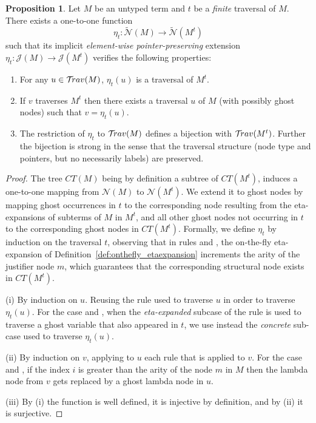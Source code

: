\documentclass{article}
\theoremstyle{definition}
\newtheorem{proposition}{Proposition}[section]
\newcommand\Nodes{\mathcal{N}}%
\newcommand\ExtendedNodes{\tilde{\Nodes}}
\newcommand{\travulc}{\travset}
\newcommand{\ctree}{CT} %
\begin{document}
\begin{proposition}
\label{prop:eta_expanded_trav}
Let $M$ be an untyped term and $t$ be a \emph{finite} traversal of $M$.
There exists a one-to-one function
$$
\eta_t : \ExtendedNodes(M) \longrightarrow \ExtendedNodes(M^t)
$$
such that its implicit \emph{element-wise pointer-preserving} extension $\eta_t : \mathcal{J}(M) \longrightarrow \mathcal{J}(M^t)$ verifies the following properties:
\begin{enumerate}[label=(\roman*)]
    \item For any $u \in \travulc(M)$, $\eta_t(u)$ is a traversal of $M^t$.

    \item If $v$ traverses
    $M^t$ then there exists a traversal $u$ of $M$ (with possibly ghost nodes) such that $v = \eta_t(u)$.

    \item The restriction of $\eta_t$ to $\mathcal{T}\!rav(M)$ defines a bijection with $\mathcal{T}\!rav(M^t)$. Further the bijection is strong in the sense that the traversal structure (node type and pointers, but no necessarily labels) are preserved.
\end{enumerate}
\end{proposition}
\begin{proof}
The tree $\ctree(M)$ being by definition a subtree of $\ctree(M^t)$, induces a one-to-one mapping from $\Nodes(M)$ to $\Nodes(M^t)$.
We extend it to ghost nodes by mapping ghost occurrences in $t$ to the corresponding node resulting from the eta-expansions of subterms of $M$ in $M^t$, and all other ghost nodes not occurring in $t$ to the corresponding ghost nodes in $\ctree(M^t)$. Formally, we define $\eta_t$ by induction on the traversal $t$, observing that in rules  and , the on-the-fly eta-expansion of Definition~\ref{def:onthefly_etaexpansion} increments the arity of the justifier node $m$, which guarantees that the corresponding structural node exists in $\ctree(M^t)$.

(i) By induction on $u$. Reusing the rule used to traverse $u$ in order to traverse $\eta_t(u)$. For the case  and , when the \emph{eta-expanded} subcase of the rule is used to traverse a ghost variable that also appeared in $t$, we use instead the \emph{concrete} sub-case used to traverse $\eta_t(u)$.

(ii) By induction on $v$, applying to $u$ each rule that is applied to $v$. For the case  and , if the index $i$ is greater than the arity of the node $m$ in $M$ then the lambda node from $v$ gets replaced by a ghost lambda node in $u$.

(iii) By (i) the function is well defined, it is injective by definition, and by (ii) it is surjective.
\end{proof}
\end{document}
